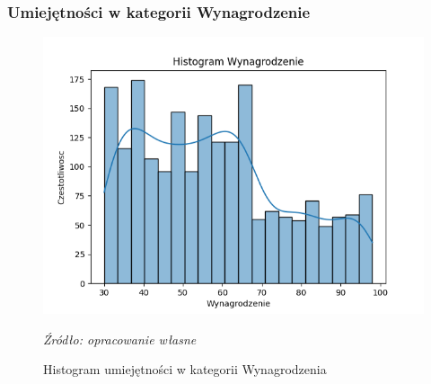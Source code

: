         \subsubsection{Umiejętności w kategorii Wynagrodzenie}
        \begin{figure}[H]
            \centering
            \includegraphics[width=\linewidth]{chapters/Images/hist_wynagrodzenie.png}
            \cprotect\caption{Histogram umiejętności w kategorii Wynagrodzenia}
            \textit{Źródło: opracowanie własne} 
            \label{fig:hist_wynagrodzenie}
        \end{figure}

